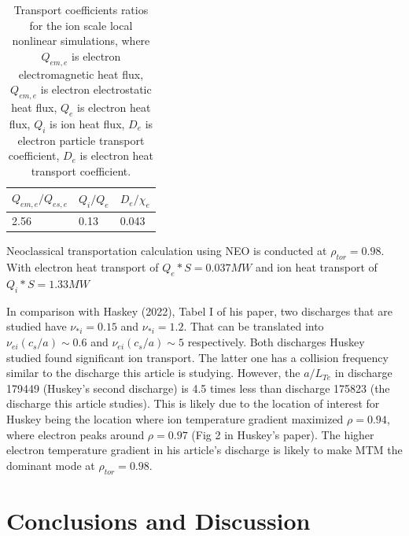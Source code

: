 \documentclass[
 aip,
 amsmath,amssymb,
 reprint
]{revtex4-1}
\begin{document}
\begin{table}[h]
\centering
\begin{tabular}{|l|l|l|}
\hline
$Q_{em,e}/Q_{es,e}$ & $Q_i/Q_e$ & $D_e/\chi_e$ \\ \hline
2.56                & 0.13      & 0.043       \\ \hline
\end{tabular}
\caption[font=5]{Transport coefficients ratios for the ion scale local nonlinear simulations, where $Q_{em,e}$ is electron electromagnetic heat flux, $Q_{em,e}$ is electron electrostatic heat flux, $Q_{e}$ is electron heat flux, $Q_{i}$ is ion heat flux, $D_e$ is electron particle transport coefficient, $D_e$ is electron heat transport coefficient. }
\label{ch:ion_NL_coeff}
\end{table}

Neoclassical transportation calculation using NEO \cite{Belli_2008,Belli_2009,Belli_2011} is conducted at $\rho_{tor}=0.98$. With electron heat transport of $Q_e*S=0.037MW$ and ion heat transport of $Q_i*S=1.33MW$



In comparison with Haskey (2022), Tabel I of his paper, two discharges that are studied have $\nu_{*i}=0.15$ and $\nu_{*i}=1.2$. That can be translated into $\nu_{ei} (c_s/a)\sim 0.6 $ and $\nu_{ei} (c_s/a) \sim 5$ respectively. Both discharges Huskey studied found significant ion transport. The latter one has a collision frequency similar to the discharge this article is studying. However, the $a/L_{Te}$ in discharge 179449 (Huskey’s second discharge) is 4.5 times less than discharge 175823 (the discharge this article studies). This is likely due to the location of interest for Huskey being the location where ion temperature gradient maximized $\rho=0.94$, where electron peaks around $\rho=0.97$ (Fig 2 in Huskey’s paper). The higher electron temperature gradient in his article’s discharge is likely to make MTM the dominant mode at $\rho_{tor}=0.98$. 



\section{Conclusions and Discussion}
\end{document}
